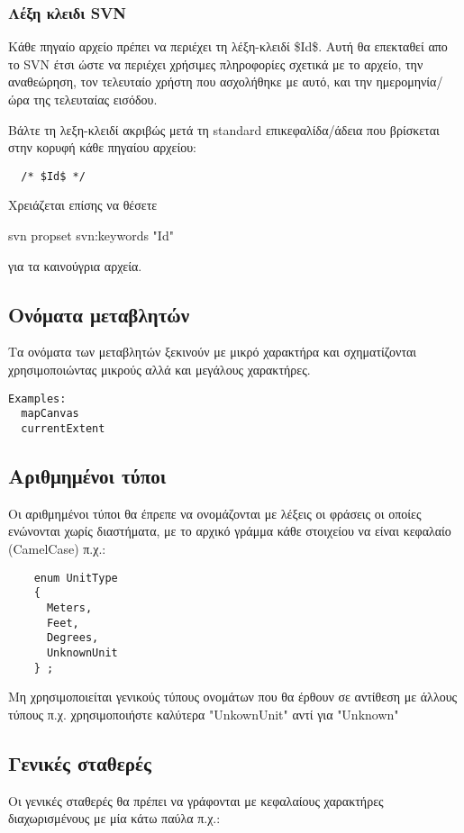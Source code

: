 \hypertarget{toc13}{}
\subsubsection{Λέξη κλειδι SVN}
Κάθε πηγαίο αρχείο πρέπει να περιέχει τη λέξη-κλειδί \$Id\$. Αυτή θα επεκταθεί απο το SVN έτσι ώστε να περιέχει χρήσιμες πληροφορίες σχετικά με το αρχείο, την αναθεώρηση, τον τελευταίο χρήστη που ασχολήθηκε με αυτό, και την ημερομηνία/ώρα της τελευταίας εισόδου.

Βάλτε τη λεξη-κλειδί ακριβώς μετά τη standard επικεφαλίδα/άδεια που βρίσκεται στην κορυφή κάθε πηγαίου αρχείου:

\begin{verbatim}
  /* $Id$ */
\end{verbatim}

Χρειάζεται επίσης να θέσετε

svn propset svn:keywords "Id"

για τα καινούγρια αρχεία.

\hypertarget{toc14}{}
\subsection{Ονόματα μεταβλητών}
Τα ονόματα των μεταβλητών ξεκινούν με μικρό χαρακτήρα και σχηματίζονται χρησιμοποιώντας μικρούς αλλά και μεγάλους χαρακτήρες.

\begin{verbatim}
Examples:
  mapCanvas
  currentExtent
\end{verbatim}

\hypertarget{toc15}{}
\subsection{Αριθμημένοι τύποι}
Οι αριθμημένοι τύποι θα έπρεπε να ονομάζονται με λέξεις οι φράσεις οι οποίες ενώνονται χωρίς διαστήματα, με το αρχικό γράμμα κάθε στοιχείου να είναι κεφαλαίο (CamelCase) π.χ.:

\begin{verbatim}
    enum UnitType
    {
      Meters,
      Feet,
      Degrees,
      UnknownUnit
    } ;
\end{verbatim}

Μη χρησιμοποιείται γενικούς τύπους ονομάτων που θα έρθουν σε αντίθεση με άλλους τύπους π.χ. χρησιμοποιήστε καλύτερα "UnkownUnit" 
αντί για "Unknown"

\hypertarget{toc16}{}
\subsection{Γενικές σταθερές}
Οι γενικές σταθερές θα πρέπει να γράφονται με κεφαλαίους χαρακτήρες διαχωρισμένους με μία κάτω παύλα π.χ.:

